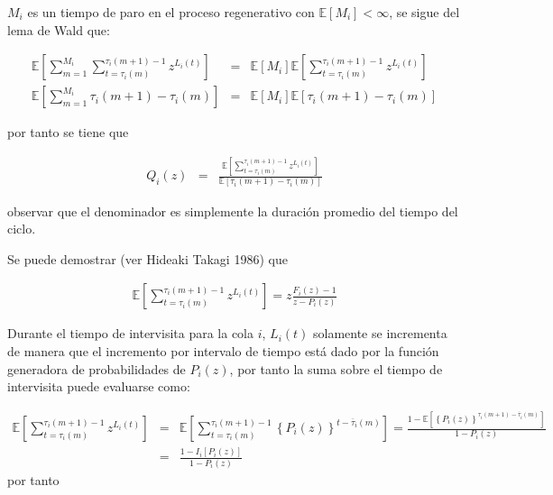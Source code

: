 \documentclass{article}
\newcommand{\esp}{\mathbb{E}}
\begin{document}
$M_{i}$ es un tiempo de paro en el proceso regenerativo con $\esp\left[M_{i}\right]<\infty$, se sigue del lema de Wald que:


\begin{eqnarray*}
\esp\left[\sum_{m=1}^{M_{i}}\sum_{t=\tau_{i}\left(m\right)}^{\tau_{i}\left(m+1\right)-1}z^{L_{i}\left(t\right)}\right]&=&\esp\left[M_{i}\right]\esp\left[\sum_{t=\tau_{i}\left(m\right)}^{\tau_{i}\left(m+1\right)-1}z^{L_{i}\left(t\right)}\right]\\
\esp\left[\sum_{m=1}^{M_{i}}\tau_{i}\left(m+1\right)-\tau_{i}\left(m\right)\right]&=&\esp\left[M_{i}\right]\esp\left[\tau_{i}\left(m+1\right)-\tau_{i}\left(m\right)\right]
\end{eqnarray*}

por tanto se tiene que


\begin{eqnarray*}
Q_{i}\left(z\right)&=&\frac{\esp\left[\sum_{t=\tau_{i}\left(m\right)}^{\tau_{i}\left(m+1\right)-1}z^{L_{i}\left(t\right)}\right]}{\esp\left[\tau_{i}\left(m+1\right)-\tau_{i}\left(m\right)\right]}
\end{eqnarray*}

observar que el denominador es simplemente la duraci\'on promedio del tiempo del ciclo.


Se puede demostrar (ver Hideaki Takagi 1986) que

\begin{eqnarray*}
\esp\left[\sum_{t=\tau_{i}\left(m\right)}^{\tau_{i}\left(m+1\right)-1}z^{L_{i}\left(t\right)}\right]=z\frac{F_{i}\left(z\right)-1}{z-P_{i}\left(z\right)}
\end{eqnarray*}

Durante el tiempo de intervisita para la cola $i$, $L_{i}\left(t\right)$ solamente se incrementa de manera que el incremento por intervalo de tiempo est\'a dado por la funci\'on generadora de probabilidades de $P_{i}\left(z\right)$, por tanto la suma sobre el tiempo de intervisita puede evaluarse como:

\begin{eqnarray*}
\esp\left[\sum_{t=\tau_{i}\left(m\right)}^{\tau_{i}\left(m+1\right)-1}z^{L_{i}\left(t\right)}\right]&=&\esp\left[\sum_{t=\tau_{i}\left(m\right)}^{\tau_{i}\left(m+1\right)-1}\left\{P_{i}\left(z\right)\right\}^{t-\overline{\tau}_{i}\left(m\right)}\right]=\frac{1-\esp\left[\left\{P_{i}\left(z\right)\right\}^{\tau_{i}\left(m+1\right)-\overline{\tau}_{i}\left(m\right)}\right]}{1-P_{i}\left(z\right)}\\
&=&\frac{1-I_{i}\left[P_{i}\left(z\right)\right]}{1-P_{i}\left(z\right)}
\end{eqnarray*}
por tanto
\end{document}
